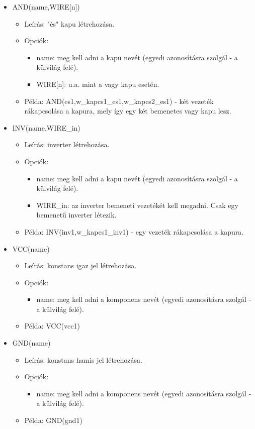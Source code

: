 \begin{itemize}
\item AND(name,WIRE[n])
	\begin{itemize}
	\item Leírás: "és" kapu létrehozása.
	\item Opciók: 
		\begin{itemize}
			\item name: meg kell adni a kapu nevét (egyedi azonosításra szolgál - a külvilág felé).
			\item WIRE[n]: u.a. mint a vagy kapu esetén.
		\end{itemize}
	\item Példa: AND(es1,w\_kapcs1\_es1,w\_kapcs2\_es1) - két vezeték rákapcsolása a kapura, mely így egy két bemenetes vagy kapu lesz.
	\end{itemize}
	
\item INV(name,WIRE\_in)
	\begin{itemize}
	\item Leírás: inverter létrehozása.
	\item Opciók: 
		\begin{itemize}
			\item name: meg kell adni a kapu nevét (egyedi azonosításra szolgál - a külvilág felé).
			\item WIRE\_in: az inverter bemeneti vezetékét kell megadni. Csak egy bemenetű inverter létezik.
		\end{itemize}
	\item Példa: INV(inv1,w\_kapcs1\_inv1) - egy vezeték rákapcsolása a kapura.
	\end{itemize}
	
\item VCC(name)
	\begin{itemize}
	\item Leírás: konstans igaz jel létrehozása.
	\item Opciók: 
		\begin{itemize}
			\item name: meg kell adni a komponens nevét (egyedi azonosításra szolgál - a külvilág felé).
		\end{itemize}
	\item Példa: VCC(vcc1)
	\end{itemize}
	
\item GND(name)
	\begin{itemize}
	\item Leírás: konstans hamis jel létrehozása.
	\item Opciók: 
		\begin{itemize}
			\item name: meg kell adni a komponens nevét (egyedi azonosításra szolgál - a külvilág felé).
		\end{itemize}
	\item Példa: GND(gnd1)
	\end{itemize}	


\end{itemize}
